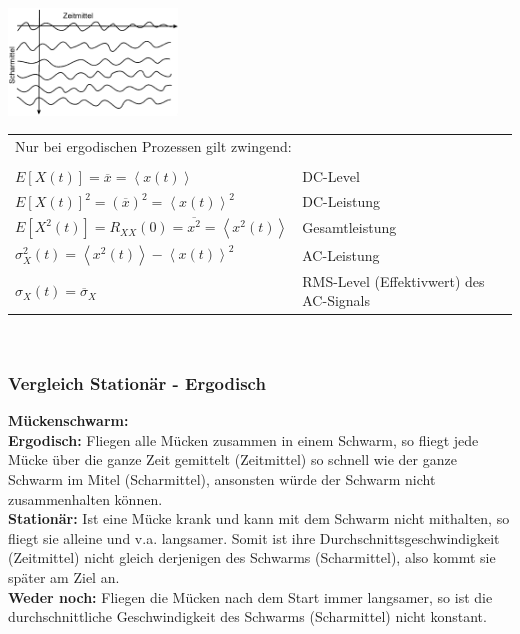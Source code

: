 	\begin{minipage}{5cm}
		\includegraphics[width=4.5cm]{bilder/zeit-scharmittel.png}
  	\end{minipage}
	\begin{minipage}{13.5cm}

	\begin{tabular}{ll}
  		\multicolumn{2}{l}{Nur bei ergodischen Prozessen gilt zwingend:} \\ \\
      $E[X(t)] = \overline{x} = \left\langle x(t) \right\rangle$ & DC-Level \\
      $E[X(t)]^{2} = (\overline{x})^{2} = \left\langle x(t) \right\rangle^{2}$ & DC-Leistung \\
      $E[X^{2}(t)] = R_{XX}(0) = \overline{x^{2}} = 
                     \left\langle x^{2}(t) \right\rangle $ & Gesamtleistung \\
      $\sigma_{X}^{2}(t) = \left\langle x^{2}(t) \right\rangle 
                           - \left\langle x(t) \right\rangle^{2}$ & AC-Leistung \\
      $\sigma_{X}(t) = \overline{\sigma}_{X}$ & RMS-Level (Effektivwert) des AC-Signals\\
    \end{tabular} \\
  	\end{minipage}


\subsubsection{Vergleich Stationär - Ergodisch}
\textbf{Mückenschwarm:}\\
\textbf{Ergodisch:} Fliegen alle Mücken zusammen in einem Schwarm, so fliegt jede Mücke über die
ganze Zeit gemittelt (Zeitmittel) so schnell wie der ganze Schwarm im Mitel (Scharmittel), ansonsten
würde der Schwarm nicht zusammenhalten können. \\
\textbf{Stationär:} Ist eine Mücke krank und kann mit dem Schwarm nicht mithalten, so fliegt sie
alleine und v.a. langsamer. Somit ist ihre Durchschnittsgeschwindigkeit (Zeitmittel) nicht gleich
derjenigen des Schwarms (Scharmittel), also kommt sie später am Ziel an. \\
\textbf{Weder noch:} Fliegen die Mücken nach dem Start immer langsamer, so ist die
durchschnittliche Geschwindigkeit des Schwarms (Scharmittel) nicht konstant.

